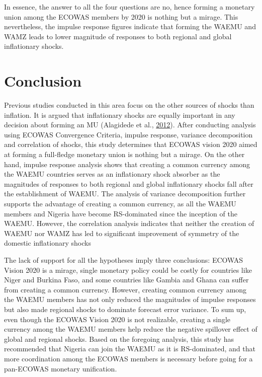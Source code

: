 \documentclass[]{article}
\begin{document}
In essence, the answer to all the four questions are no, hence forming a monetary union among the ECOWAS members by 2020 is nothing but a mirage. This nevertheless, the impulse response figures indicate that forming the WAEMU and WAMZ leads to lower magnitude of responses to both regional and global inflationary shocks.

\hypertarget{conclusion}{%
\section{Conclusion}\label{conclusion}}

Previous studies conducted in this area focus on the other sources of shocks than inflation. It is argued that inflationary shocks are equally important in any decision about forming an MU (Alagidede et al., \protect\hyperlink{ref-ALAGIDEDE2012460}{2012}). After conducting analysis using ECOWAS Convergence Criteria, impulse response, variance decomposition and correlation of shocks, this study determines that ECOWAS vision 2020 aimed at forming a full-fledge monetary union is nothing but a mirage. On the other hand, impulse response analysis shows that creating a common currency among the WAEMU countries serves as an inflationary shock absorber as the magnitudes of responses to both regional and global inflationary shocks fall after the establishment of WAEMU. The analysis of variance decomposition further supports the advantage of creating a common currency, as all the WAEMU members and Nigeria have become RS-dominated since the inception of the WAEMU. However, the correlation analysis indicates that neither the creation of WAEMU nor WAMZ has led to significant improvement of symmetry of the domestic inflationary shocks

The lack of support for all the hypotheses imply three conclusions: ECOWAS Vision 2020 is a mirage, single monetary policy could be costly for countries like Niger and Burkina Faso, and some countries like Gambia and Ghana can suffer from creating a common currency. However, creating common currency among the WAEMU members has not only reduced the magnitudes of impulse responses but also made regional shocks to dominate forecast error variance. To sum up, even though the ECOWAS Vision 2020 is not realizable, creating a single currency among the WAEMU members help reduce the negative spillover effect of global and regional shocks. Based on the foregoing analysis, this study has recommended that Nigeria can join the WAEMU as it is RS-dominated, and that more coordination among the ECOWAS members is necessary before going for a pan-ECOWAS monetary unification.
\end{document}
